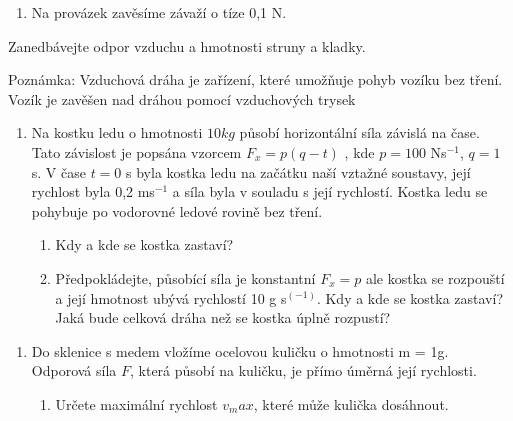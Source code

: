 \documentclass[letterpaper,10pt,english]{jupyterBook}
\begin{document}
{{\begin{enumerate}
\begin{enumerate}
\item {} 
\sphinxAtStartPar
Na provázek zavěsíme závaží o tíze 0,1 N.

\end{enumerate}

\end{enumerate}

\sphinxAtStartPar
Zanedbávejte odpor vzduchu a hmotnosti struny a kladky.

\sphinxAtStartPar
Poznámka: Vzduchová dráha je zařízení, které umožňuje pohyb vozíku bez tření. Vozík je zavěšen nad dráhou pomocí vzduchových trysek

\sphinxAtStartPar


\sphinxAtStartPar
{}
\begin{enumerate}
%
\setcounter{enumi}{1}
\item {} 
\sphinxAtStartPar
Na kostku ledu o hmotnosti \(10 kg\) působí horizontální síla závislá na čase. Tato závislost je popsána vzorcem \(F_x = p(q − t)\) , kde \(p = 100\) Ns\(^{−1}\), \(q = 1\) s. V čase \(t = 0\) s byla kostka ledu na začátku naší vztažné soustavy, její rychlost byla 0,2 ms\(^{−1}\) a síla byla v souladu s její rychlostí. Kostka ledu se pohybuje po vodorovné ledové rovině bez tření.
\begin{enumerate}
%
\item {} 
\sphinxAtStartPar
Kdy a kde se kostka zastaví?

\item {} 
\sphinxAtStartPar
Předpokládejte, působící síla je konstantní \(F_x = p\) ale kostka se rozpouští a její hmotnost ubývá rychlostí 10 g s\(^(-1)\). Kdy a kde se kostka zastaví? Jaká bude celková dráha než se kostka úplně rozpustí?

\end{enumerate}

\end{enumerate}

\sphinxAtStartPar
{}
\begin{enumerate}
%
\setcounter{enumi}{2}
\item {} 
\sphinxAtStartPar
Do sklenice s medem vložíme ocelovou kuličku o hmotnosti m = 1g. Odporová síla \(F\), která působí na kuličku, je přímo úměrná její rychlosti.
\begin{enumerate}
%
\item {} 
\sphinxAtStartPar
Určete maximální rychlost \(v_max\), které může kulička dosáhnout.


\end{enumerate}
\end{enumerate}}}
\end{document}
